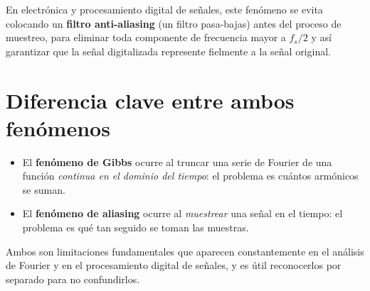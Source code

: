 \documentclass[11pt]{article}
\begin{document}
En electrónica y procesamiento digital de señales, este fenómeno
se evita colocando un \textbf{filtro anti-aliasing} (un filtro
pasa-bajas) antes del proceso de muestreo, para eliminar toda
componente de frecuencia mayor a $f_s/2$ y así garantizar que la
señal digitalizada represente fielmente a la señal original.

\section{Diferencia clave entre ambos fenómenos}

\begin{itemize}
    \item El \textbf{fenómeno de Gibbs} ocurre al truncar una serie
    de Fourier de una función \emph{continua en el dominio del
    tiempo}: el problema es cuántos armónicos se suman.
    \item El \textbf{fenómeno de aliasing} ocurre al
    \emph{muestrear} una señal en el tiempo: el problema es qué
    tan seguido se toman las muestras.
\end{itemize}

Ambos son limitaciones fundamentales que aparecen constantemente
en el análisis de Fourier y en el procesamiento digital de
señales, y es útil reconocerlos por separado para no confundirlos.
\end{document}
